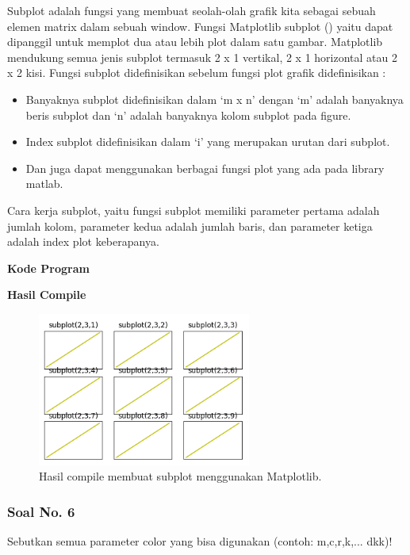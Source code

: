 \hfill \break
Subplot adalah fungsi yang membuat seolah-olah grafik kita sebagai sebuah elemen matrix dalam sebuah window. Fungsi Matplotlib subplot () yaitu dapat dipanggil untuk memplot dua atau lebih plot dalam satu gambar. Matplotlib mendukung semua jenis subplot termasuk 2 x 1 vertikal, 2 x 1 horizontal atau 2 x 2 kisi. Fungsi subplot didefinisikan sebelum fungsi plot grafik didefinisikan :
\begin{itemize}
  \item Banyaknya subplot didefinisikan dalam `m x n’ dengan `m’ adalah banyaknya beris subplot dan `n’ adalah banyaknya kolom subplot pada figure.
  \item Index subplot didefinisikan dalam `i’ yang merupakan urutan dari subplot.
  \item Dan juga dapat menggunakan berbagai fungsi plot yang ada pada library matlab.
\end{itemize}

\hfill \break
Cara kerja subplot, yaitu fungsi subplot memiliki parameter pertama adalah jumlah kolom, parameter kedua adalah jumlah baris, dan parameter ketiga adalah index plot keberapanya.

\hfill \break
\textbf{Kode Program}



\hfill \break
\textbf{Hasil Compile}

\begin{figure}[H]
	\includegraphics[width=7cm]{figures/6/1144124/subplot.png}
	\centering
	\caption{Hasil compile membuat subplot menggunakan Matplotlib.}
\end{figure}

\subsubsection{Soal No. 6}
\hfill \break
Sebutkan semua parameter color yang bisa digunakan (contoh:  m,c,r,k,...  dkk)!


